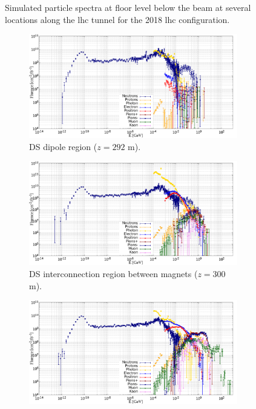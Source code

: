 \documentclass[encoding=utf8,british]{tumphthesis}
\begin{document}
\begin{figure}[H]
\begin{subfigure}{0.69\textwidth}
\end{subfigure}

\caption{Simulated particle spectra at floor level below the beam at several locations along the \acrshort{lhc} tunnel for the 2018 \acrshort{lhc} configuration.}
\label{fig:LHC-particle-distributions-LSS}
\end{figure}


\begin{figure}[H]
    \centering
\begin{subfigure}{0.69\textwidth}
    \centering
  \includegraphics[width=\linewidth]{results/particle_spectra_location_DSDP1.png}
  \caption{DS dipole region ($z=292$ m).}
  \label{fig:LHC-particle-distributions-DS-dipole}
\end{subfigure}\hfill
\begin{subfigure}{0.69\textwidth}
    \centering
  \includegraphics[width=\linewidth]{results/particle_spectra_location_DSIC1.png}
  \caption{DS interconnection region between magnets ($z=300$ m).}
  \label{fig:LHC-particle-distributions-DS-IC}
\end{subfigure}
\hfill
\begin{subfigure}{0.69\textwidth}
    \centering
  \includegraphics[width=\linewidth]{results/particle_spectra_location_OF1.png}

\end{subfigure}
\end{figure}
\end{document}
